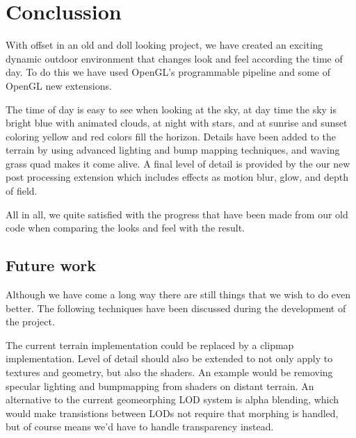 
\chapter{Conclussion}
With offset in an old and doll looking project, we have created an
exciting dynamic outdoor environment that changes look and feel
according the time of day. To do this we have used OpenGL's
programmable pipeline and some of OpenGL new extensions.

The time of day is easy to see when looking at the sky, at day time
the sky is bright blue with animated clouds, at night with stars, and
at sunrise and sunset coloring yellow and red colors fill the horizon.
%
Details have been added to the terrain by using advanced lighting and
bump mapping techniques, and waving grass quad makes it come alive.
%
A final level of detail is provided by the our new post processing
extension which includes effects as motion blur, glow, and depth of
field.

All in all, we quite satisfied with the progress that have been made
from our old code when comparing the looks and feel with the result.







\section{Future work}
Although we have come a long way there are still things that we wish to
do even better. The following techniques have been discussed during
the development of the project.

The current terrain implementation could be replaced by a clipmap
implementation. Level of detail should also be extended to not only
apply to textures and geometry, but also the shaders. An example would
be removing specular lighting and bumpmapping from shaders on distant
terrain. An alternative to the current geomeorphing LOD system is
alpha blending, which would make transistions between LODs not require
that morphing is handled, but of course means we'd have to handle
transparency instead.

